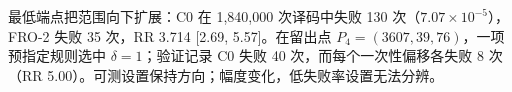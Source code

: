 最低端点把范围向下扩展：C0 在 1{,}840{,}000 次译码中失败 130 次（$7.07\times10^{-5}$），FRO-2 失败 35 次，RR 3.714 [2.69, 5.57]。在留出点 $P_4=(3607,39,76)$，一项预指定规则选中 $\delta=1$；验证记录 C0 失败 40 次，而每个一次性偏移各失败 8 次（RR 5.00）。可测设置保持方向；幅度变化，低失败率设置无法分辨。

